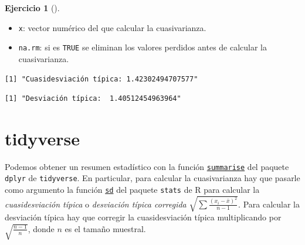 \documentclass[
  spanish,
  a4paper,
]{scrreport}
\newenvironment{Shaded}{\begin{snugshade}}{\end{snugshade}}
\newcommand{\CommentTok}[1]{\textcolor[rgb]{0.37,0.37,0.37}{#1}}
\newcommand{\DecValTok}[1]{\textcolor[rgb]{0.68,0.00,0.00}{#1}}
\newcommand{\FunctionTok}[1]{\textcolor[rgb]{0.28,0.35,0.67}{#1}}
\newcommand{\NormalTok}[1]{\textcolor[rgb]{0.00,0.23,0.31}{#1}}
\newcommand{\OtherTok}[1]{\textcolor[rgb]{0.00,0.23,0.31}{#1}}
\newcommand{\SpecialCharTok}[1]{\textcolor[rgb]{0.37,0.37,0.37}{#1}}
\newcommand{\StringTok}[1]{\textcolor[rgb]{0.13,0.47,0.30}{#1}}
\providecommand{\tightlist}{%
  \setlength{\itemsep}{0pt}\setlength{\parskip}{0pt}}
\theoremstyle{definition}
\newtheorem{exercise}{Ejercicio}[chapter]
\theoremstyle{remark}
\begin{document}
\begin{exercise}[]
\begin{enumerate}
\begin{tcolorbox}
  \begin{itemize}
  \tightlist
  \item
    \texttt{x}: vector numérico del que calcular la cuasivarianza.
  \item
    \texttt{na.rm}: si es \texttt{TRUE} se eliminan los valores perdidos
    antes de calcular la cuasivarianza.
  \end{itemize}

\begin{Shaded}
\end{Shaded}

\begin{verbatim}
[1] "Cuasidesviación típica: 1.42302494707577"
\end{verbatim}

\begin{Shaded}
\end{Shaded}

\begin{verbatim}
[1] "Desviación típica:  1.40512454963964"
\end{verbatim}

  \section{tidyverse}

  Podemos obtener un resumen estadístico con la función
  \href{https://dplyr.tidyverse.org/reference/summarise.html}{\texttt{summarise}}
  del paquete \texttt{dplyr} de \texttt{tidyverse}. En particular, para
  calcular la cuasivarianza hay que pasarle como argumento la función
  \href{https://www.rdocumentation.org/packages/stats/versions/3.6.2/topics/sd}{\texttt{sd}}
  del paquete \texttt{stats} de R para calcular la \emph{cuasidesviación
  típica} o \emph{desviación típica corregida}
  \(\sqrt{\sum \frac{(x_i-\bar x)^2}{n-1}}\). Para calcular la
  desviación típica hay que corregir la cuasidesviación típica
  multiplicando por \(\sqrt{\frac{n-1}{n}}\), donde \(n\) es el tamaño
  muestral.


\end{tcolorbox}
\end{enumerate}
\end{exercise}
\end{document}
